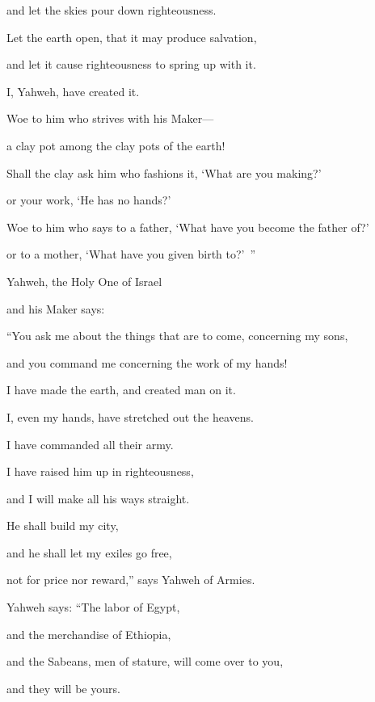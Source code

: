 {\par }{\QB and let the skies pour down righteousness.
\par }{\Q Let the earth open, that it may produce salvation,
\par }{\QB and let it cause righteousness to spring up with it.
\par }{\Q I, Yahweh, have created it.
\par }{\BB \par }{\Q {}Woe to him who strives with his Maker—
\par }{\QB a clay pot among the clay pots of the earth!
\par }{\Q Shall the clay ask him who fashions it, ‘What are you making?’
\par }{\QB or your work, ‘He has no hands?’
\par }{\Q {}Woe to him who says to a father, ‘What have you become the father of?’
\par }{\QB or to a mother, ‘What have you given birth to?’ ”
\par }{\BB \par }{\Q {}Yahweh, the Holy One of Israel
\par }{\QB and his Maker says:
\par }{\Q “You ask me about the things that are to come, concerning my sons,
\par }{\QB and you command me concerning the work of my hands!
\par }{\Q {}I have made the earth, and created man on it.
\par }{\QB I, even my hands, have stretched out the heavens.
\par }{\QB I have commanded all their army.
\par }{\Q {}I have raised him up in righteousness,
\par }{\QB and I will make all his ways straight.
\par }{\Q He shall build my city,
\par }{\QB and he shall let my exiles go free,
\par }{\QB not for price nor reward,” says Yahweh of Armies.
\par }{\BB \par }{\Q {}Yahweh says: “The labor of Egypt,
\par }{\QB and the merchandise of Ethiopia,
\par }{\QB and the Sabeans, men of stature, will come over to you,
\par }{\QB and they will be yours.
}

